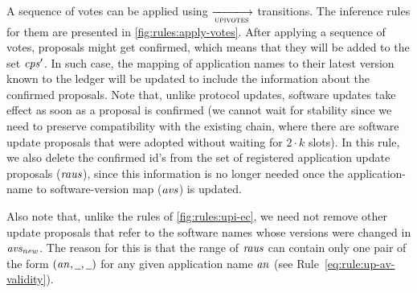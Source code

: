 \clearpage

A sequence of votes can be applied using $\trans{upivotes}{}$ transitions. The
inference rules for them are presented in \cref{fig:rules:apply-votes}. After
applying a sequence of votes, proposals might get confirmed, which means that
they will be added to the set $\mathit{cps'}$. In such case, the mapping of
application names to their latest version known to the ledger will be updated to
include the information about the confirmed proposals. Note that, unlike
protocol updates, software updates take effect as soon as a proposal is
confirmed (we cannot wait for stability since we need to preserve compatibility
with the existing chain, where there are software update proposals that were
adopted without waiting for $2\cdot k$ slots). In this rule, we also delete the
confirmed id's from the set of registered application update proposals
($\mathit{raus}$), since this information is no longer needed once the
application-name to software-version map ($\mathit{avs}$) is updated.

Also note that, unlike the rules of \cref{fig:rules:upi-ec}, we need not remove
other update proposals that refer to the software names whose versions were
changed in $\mathit{avs_{new}}$. The reason for this is that the range of $\mathit{raus}$
can contain only one pair of the form $(\var{an}, \wcard, \wcard)$ for any given
application name $\mathit{an}$ (see Rule~\ref{eq:rule:up-av-validity}).


